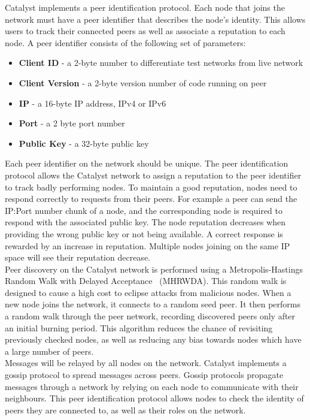 Catalyst implements a peer identification protocol. Each node that joins the network must have a peer identifier that describes the node’s identity. This allows users to track their connected peers as well as associate a reputation to each node. A peer identifier consists of the following set of parameters:

\begin{itemize}
\item \textbf{Client ID} - a 2-byte number to differentiate test networks from live network
\item \textbf{Client Version} - a 2-byte version number of code running on peer 
\item \textbf{IP} - a 16-byte IP address, IPv4 or IPv6
\item \textbf{Port} - a 2 byte port number 
\item \textbf{Public Key} - a 32-byte public key
\end{itemize}

Each peer identifier on the network should be unique. The peer identification protocol allows the Catalyst network to assign a reputation to the peer identifier to track badly performing nodes. To maintain a good reputation, nodes need to respond correctly to requests from their peers. For example a peer can send the IP:Port number chunk of a node, and the corresponding node is required to respond with the associated public key. The node reputation decreases when providing the wrong public key or not being available. A correct response is rewarded by an increase in reputation. Multiple nodes joining on the same IP space will see their reputation decrease. \\

Peer discovery on the Catalyst network is performed using a Metropolis-Hastings Random Walk with Delayed Acceptance~\cite{hasting} (MHRWDA). This random walk is designed to cause a high cost to eclipse attacks from malicious nodes. When a new node joins the network, it connects to a random seed peer. It then performs a random walk through the peer network, recording discovered peers only after an initial burning period. This algorithm reduces the chance of revisiting previously checked nodes, as well as reducing any bias towards nodes which have a large number of peers. \\

Messages will be relayed by all nodes on the network. Catalyst implements a gossip protocol to spread messages across peers. Gossip protocols propagate messages through a network by relying on each node to communicate with their neighbours. This peer identification protocol allows nodes to check the identity of peers they are connected to, as well as their roles on the network. 
